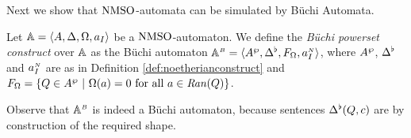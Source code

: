 Next we show that $\mathrm{NMSO}$-automata can be simulated by B\"{u}chi Automata.

\begin{definition}
\label{DEF_BuchiPowersetConstruction}
Let $\mathbb{A} = \langle{A,\Delta,\Omega,a_I}\rangle$ be a $\mathrm{NMSO}$-automaton. We define the \emph{B\"{u}chi powerset construct} over
$\mathbb{A}$ as the B\"{u}chi automaton $\mathbb{A}^{{\scriptscriptstyle B}} = \langle{A^{\wp}, \Delta^{\flat},F_{\Omega},a_I^{{\scriptscriptstyle N}}}\rangle$, where $A^{\wp}$, $\Delta^{\flat}$ and $a_I^{{\scriptscriptstyle N}}$ are as in Definition \ref{def:noetherianconstruct} and $F_{\pmap} = \{Q \in \shA\ |\ \pmap(a)=0 \text{ for all } a \in \mathit{Ran}(Q)\}$.
\end{definition}

Observe that $\mathbb{A}^{{\scriptscriptstyle B}}$ is indeed a B\"{u}chi automaton, because sentences $\Delta^{\flat}(Q,c)$ are by construction of the required shape.

